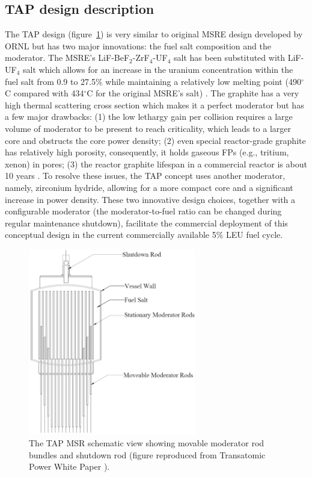 \documentclass[12pt]{article} %
\begin{document}
\subsection{TAP design description}
The \gls{TAP} design (figure~\ref{fig:tap-main-view}) is very similar to original \gls{MSRE} design developed 
by \gls{ORNL} \cite{haubenreich_experience_1970} but has two major innovations: 
the fuel salt composition and the moderator. The \gls{MSRE}'s 
LiF-BeF$_2$-ZrF$_4$-UF$_4$ salt has been substituted with LiF-UF$_4$ salt which 
allows for an increase in the uranium concentration within the fuel salt from 0.9 to 
27.5\% while maintaining a relatively low melting point (490$^{\circ}$C compared 
with 434$^{\circ}$C for the original \gls{MSRE}'s salt) 
\cite{betzler_two-dimensional_2016}. The graphite has a very high 
thermal scattering cross section which makes it a perfect moderator but has 
a few major drawbacks: 
(1) the low lethargy gain per collision requires a large volume of moderator 
to be present to reach criticality, which leads to a larger core and obstructs 
the core power density; (2) even special 
reactor-grade graphite has relatively high porosity, consequently, it holds
gaseous \glspl{FP} 
(e.g., tritium, xenon) in pores; (3) the reactor graphite lifespan in a commercial 
reactor is about 10 years \cite{robertson_conceptual_1971}. To resolve these 
issues, the \gls{TAP} concept uses another 
moderator, namely, zirconium hydride, allowing for a more compact core and a 
significant increase in power density. These two innovative design choices,  
together with a configurable moderator 
(the moderator-to-fuel ratio can be changed during regular maintenance shutdown), 
facilitate the commercial deployment of this conceptual design in the current 
commercially available 5\% \gls{LEU} fuel cycle. 
\begin{figure}[htp!] %
  		\hspace{+1.6in}
		  \includegraphics[width=0.65\textwidth]{tap_front_view.png}
  \caption{The \gls{TAP} \gls{MSR} schematic view showing movable moderator rod 
  bundles and shutdown rod (figure reproduced from Transatomic Power White Paper 
\cite{transatomic_power_corporation_technical_2016}).}
  \label{fig:tap-main-view}
\end{figure}
\end{document}
